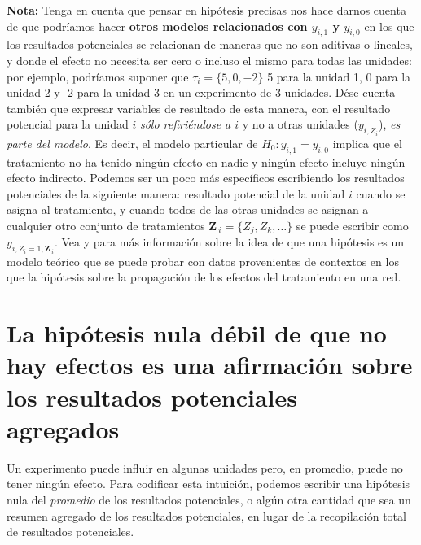 \documentclass[
]{article}
\begin{document}
\textbf{Nota:} Tenga en cuenta que pensar en hipótesis precisas nos hace darnos cuenta de
que podríamos hacer \textbf{otros modelos relacionados con \(y_{i, 1}\) y \(y_{i, 0}\)} en los que los resultados potenciales se relacionan de maneras que no son aditivas o lineales, y donde el efecto no necesita ser cero o incluso el mismo para todas las unidades: por ejemplo, podríamos suponer que \(\tau_i = \{5,0, -2 \}\) 5 para la unidad 1, 0 para la unidad 2 y -2 para la unidad 3 en un experimento de 3 unidades. Dése cuenta también que expresar variables de resultado de esta manera, con el resultado potencial para la unidad \(i\) \emph{sólo refiriéndose a \(i\)} y no a otras unidades (\(y_ {i, Z_i}\)), \emph{es parte del modelo}. Es decir, el modelo particular de \(H_0: y_{i, 1} = y_{i, 0}\) implica que el tratamiento no ha tenido ningún efecto en nadie y ningún efecto incluye ningún efecto indirecto. Podemos ser un poco más específicos escribiendo los resultados potenciales de la siguiente manera: resultado potencial de la unidad \(i\) cuando se asigna al tratamiento, y cuando todos de las otras unidades se asignan a cualquier otro conjunto de tratamientos \(\mathbf{Z}_ {~ i} = \{Z_j, Z_k, \ldots \}\) se puede escribir como \(y_{i,Z_i=1,\mathbf{Z}_{~i}}\). Vea \textcite{bowers2013reasoning} y \textcite{bowers2018models} para más información sobre la idea de que una hipótesis es un modelo teórico que se puede probar con datos provenientes de contextos en los que la hipótesis sobre la propagación de los efectos del tratamiento en una red.

\hypertarget{la-hipuxf3tesis-nula-duxe9bil-de-que-no-hay-efectos-es-una-afirmaciuxf3n-sobre-los-resultados-potenciales-agregados}{%
\section{La hipótesis nula débil de que no hay efectos es una afirmación sobre los resultados potenciales agregados}\label{la-hipuxf3tesis-nula-duxe9bil-de-que-no-hay-efectos-es-una-afirmaciuxf3n-sobre-los-resultados-potenciales-agregados}}

Un experimento puede influir en algunas unidades pero, en promedio, puede no tener ningún efecto. Para codificar esta intuición, podemos escribir una hipótesis nula del \emph{promedio} de los resultados potenciales, o algún otra cantidad que sea un resumen agregado de los resultados potenciales, en lugar de la
recopilación total de resultados potenciales.
\end{document}
